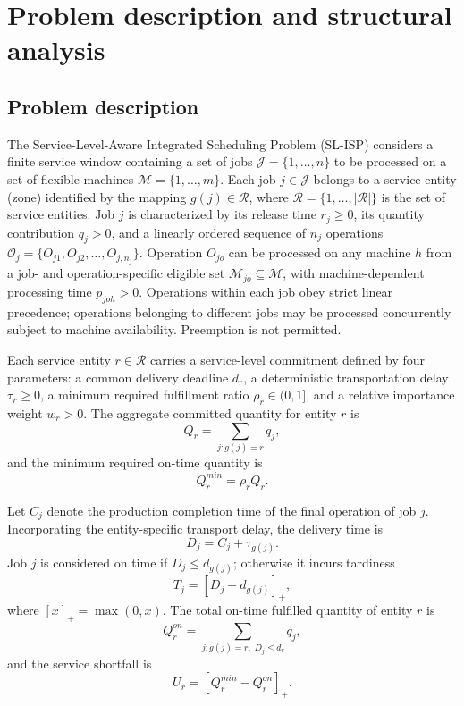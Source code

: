 \section{Problem description and structural analysis}
\label{sec:problem_theory}

\subsection{Problem description}

The Service-Level-Aware Integrated Scheduling Problem (SL-ISP) considers a finite service window containing a set of jobs $\mathcal J=\{1,\dots,n\}$ to be processed on a set of flexible machines $\mathcal M=\{1,\dots,m\}$. Each job $j\in\mathcal J$ belongs to a service entity (zone) identified by the mapping $g(j)\in\mathcal R$, where $\mathcal R=\{1,\dots,|\mathcal R|\}$ is the set of service entities. Job $j$ is characterized by its release time $r_j\ge 0$, its quantity contribution $q_j>0$, and a linearly ordered sequence of $n_j$ operations $\mathcal O_j=\{O_{j1},O_{j2},\dots,O_{j,n_j}\}$. Operation $O_{jo}$ can be processed on any machine $h$ from a job- and operation-specific eligible set $\mathcal M_{jo}\subseteq\mathcal M$, with machine-dependent processing time $p_{joh}>0$. Operations within each job obey strict linear precedence; operations belonging to different jobs may be processed concurrently subject to machine availability. Preemption is not permitted.

Each service entity $r\in\mathcal R$ carries a service-level commitment defined by four parameters: a common delivery deadline $d_r$, a deterministic transportation delay $\tau_r\ge 0$, a minimum required fulfillment ratio $\rho_r\in(0,1]$, and a relative importance weight $w_r>0$. The aggregate committed quantity for entity $r$ is
\begin{equation}
Q_r=\sum_{j:g(j)=r} q_j,
\end{equation}
and the minimum required on-time quantity is
\begin{equation}
Q_r^{min}=\rho_r Q_r.
\end{equation}

Let $C_j$ denote the production completion time of the final operation of job $j$. Incorporating the entity-specific transport delay, the delivery time is
\begin{equation}
D_j=C_j+\tau_{g(j)}.
\end{equation}
Job $j$ is considered on time if $D_j\le d_{g(j)}$; otherwise it incurs tardiness
\begin{equation}
T_j=[D_j-d_{g(j)}]_+,
\end{equation}
where $[x]_+=\max(0,x)$. The total on-time fulfilled quantity of entity $r$ is
\begin{equation}
Q_r^{on}=\sum_{j:g(j)=r,\;D_j\le d_r} q_j,
\end{equation}
and the service shortfall is
\begin{equation}
U_r=[Q_r^{min}-Q_r^{on}]_+.
\end{equation}

